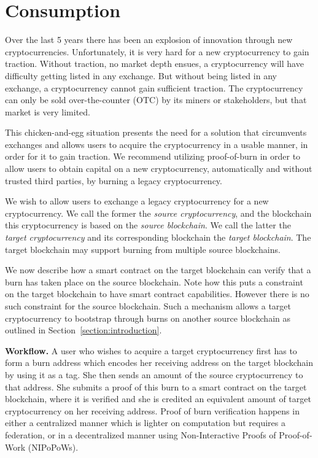 \section{Consumption}

Over the last 5 years there has been an explosion of innovation through new cryptocurrencies. Unfortunately, it is very hard for a new cryptocurrency to gain traction. Without traction, no market depth ensues, a cryptocurrency will have difficulty getting listed in any exchange. But without being listed in any exchange, a cryptocurrency cannot gain sufficient traction. The cryptocurrency can only be sold over-the-counter (OTC) by its miners or stakeholders, but that market is very limited.

This chicken-and-egg situation presents the need for a solution that circumvents exchanges and allows users to acquire the cryptocurrency in a usable manner, in order for it to gain traction. We recommend utilizing proof-of-burn in order to allow users to obtain capital on a new cryptocurrency, automatically and without trusted third parties, by burning a legacy cryptocurrency.

We wish to allow users to exchange a legacy cryptocurrency for a new cryptocurrency. We call the former the \emph{source cryptocurrency}, and the blockchain this cryptocurrency is based on the \emph{source blockchain}. We call the latter the \emph{target cryptocurrency} and its corresponding blockchain the \emph{target blockchain}. The target blockchain may support burning from multiple source blockchains.

We now describe how a smart contract on the target blockchain can verify that a burn has taken place on the source blockchain. Note how this puts a constraint on the target blockchain to have smart contract capabilities. However there is no such constraint for the source blockchain. Such a mechanism allows a target cryptocurrency to bootstrap through burns on another source blockchain as outlined in Section~\ref{section:introduction}.

\noindent
\textbf{Workflow.}
A user who wishes to acquire a target cryptocurrency first has to form a burn address which encodes her receiving address on the target blockchain by using it as a tag. She then sends an amount of the source cryptocurrency to that address. She submits a proof of this burn to a smart contract on the target blockchain, where it is verified and she is credited an equivalent amount of target cryptocurrency on her receiving address. Proof of burn verification happens in either a centralized manner which is lighter on computation but requires a federation, or in a decentralized manner using Non-Interactive Proofs of Proof-of-Work (NIPoPoWs).

